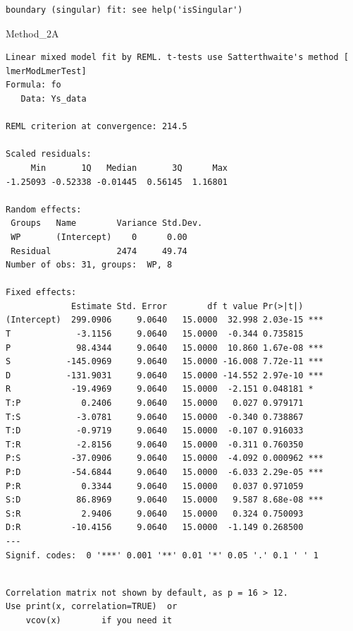 \documentclass[
  letterpaper,
  DIV=11,
  numbers=noendperiod]{scrartcl}
\newenvironment{Shaded}{\begin{snugshade}}{\end{snugshade}}
\newcommand{\NormalTok}[1]{\textcolor[rgb]{0.00,0.23,0.31}{#1}}
\begin{document}
\begin{verbatim}
boundary (singular) fit: see help('isSingular')
\end{verbatim}

\begin{Shaded}
\begin{Highlighting}[]
\NormalTok{Method\_2A}
\end{Highlighting}
\end{Shaded}

\begin{verbatim}
Linear mixed model fit by REML. t-tests use Satterthwaite's method [
lmerModLmerTest]
Formula: fo
   Data: Ys_data

REML criterion at convergence: 214.5

Scaled residuals: 
     Min       1Q   Median       3Q      Max 
-1.25093 -0.52338 -0.01445  0.56145  1.16801 

Random effects:
 Groups   Name        Variance Std.Dev.
 WP       (Intercept)    0      0.00   
 Residual             2474     49.74   
Number of obs: 31, groups:  WP, 8

Fixed effects:
             Estimate Std. Error        df t value Pr(>|t|)    
(Intercept)  299.0906     9.0640   15.0000  32.998 2.03e-15 ***
T             -3.1156     9.0640   15.0000  -0.344 0.735815    
P             98.4344     9.0640   15.0000  10.860 1.67e-08 ***
S           -145.0969     9.0640   15.0000 -16.008 7.72e-11 ***
D           -131.9031     9.0640   15.0000 -14.552 2.97e-10 ***
R            -19.4969     9.0640   15.0000  -2.151 0.048181 *  
T:P            0.2406     9.0640   15.0000   0.027 0.979171    
T:S           -3.0781     9.0640   15.0000  -0.340 0.738867    
T:D           -0.9719     9.0640   15.0000  -0.107 0.916033    
T:R           -2.8156     9.0640   15.0000  -0.311 0.760350    
P:S          -37.0906     9.0640   15.0000  -4.092 0.000962 ***
P:D          -54.6844     9.0640   15.0000  -6.033 2.29e-05 ***
P:R            0.3344     9.0640   15.0000   0.037 0.971059    
S:D           86.8969     9.0640   15.0000   9.587 8.68e-08 ***
S:R            2.9406     9.0640   15.0000   0.324 0.750093    
D:R          -10.4156     9.0640   15.0000  -1.149 0.268500    
---
Signif. codes:  0 '***' 0.001 '**' 0.01 '*' 0.05 '.' 0.1 ' ' 1
\end{verbatim}

\begin{verbatim}

Correlation matrix not shown by default, as p = 16 > 12.
Use print(x, correlation=TRUE)  or
    vcov(x)        if you need it
\end{verbatim}
\end{document}
